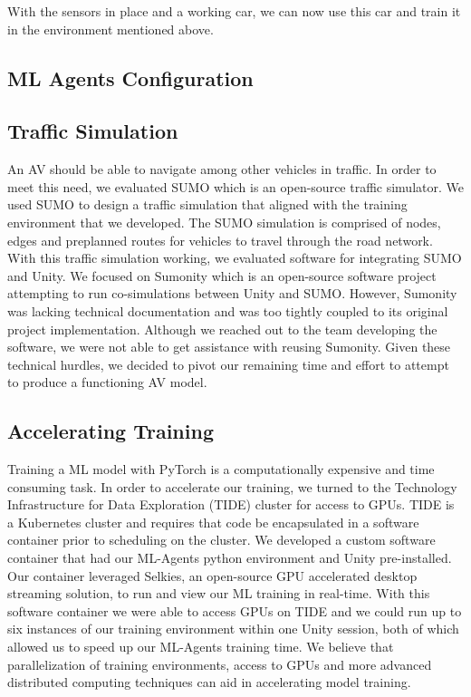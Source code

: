 \documentclass[conference]{IEEEtran}
\begin{document}
With the sensors in place and a working car, we can now use this car and train it in the environment mentioned above.

\subsection{ML Agents Configuration}

\subsection{Traffic Simulation}
An AV should be able to navigate among other vehicles in traffic. 
In order to meet this need, we evaluated SUMO which is an open-source traffic simulator\cite{alvarezlopez2018}.
We used SUMO to design a traffic simulation that aligned with the training environment that we developed.
The SUMO simulation is comprised of nodes, edges and preplanned routes for vehicles to travel through the road network.
With this traffic simulation working, we evaluated software for integrating SUMO and Unity.
We focused on Sumonity which is an open-source software project attempting to run co-simulations between Unity and SUMO\cite{pechinger2024sumonity}.
However, Sumonity was lacking technical documentation and was too tightly coupled to its original project implementation. 
Although we reached out to the team developing the software, we were not able to get assistance with reusing Sumonity.
Given these technical hurdles, we decided to pivot our remaining time and effort to attempt to produce a functioning AV model.

\subsection{Accelerating Training}
Training a ML model with PyTorch is a computationally expensive and time consuming task.
In order to accelerate our training, we turned to the Technology Infrastructure for Data Exploration (TIDE) cluster for access to GPUs\cite{tidesdsu}.
TIDE is a Kubernetes cluster and requires that code be encapsulated in a software container prior to scheduling on the cluster.
We developed a custom software container that had our ML-Agents python environment and Unity pre-installed.
Our container leveraged Selkies, an open-source GPU accelerated desktop streaming solution, to run and view our ML training in real-time\cite{selkiestreamer}.
With this software container we were able to access GPUs on TIDE and we could run up to six instances of our training environment within one Unity session, both of which allowed us to speed up our ML-Agents training time.
We believe that parallelization of training environments, access to GPUs and more advanced distributed computing techniques can aid in accelerating model training.
\end{document}
